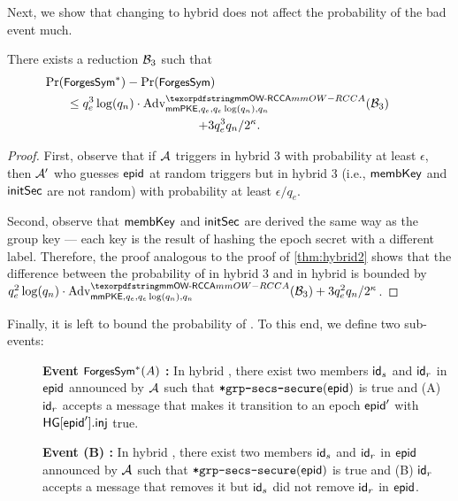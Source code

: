 Next, we show that changing to hybrid \hybridThreeN does not affect the probability of the bad event much.
\begin{claim}
  There exists a reduction $\Bdv[3]$ such that
  \begin{multline*}
    \Pr(\forgessN) - \Pr(\forgess) \hspace*{16em}\\\leq q_e^3\log(q_n) \cdot
    \textnormal{Adv}^{\mmowrcca}_{\mmPKE,q_e,q_e\log(q_n),q_n}(\Bdv[3]) \\
    + 3q_e^3q_n/2^\kappa.
  \end{multline*}
\end{claim}
\begin{proof}
  First, observe that if $\Adv$ triggers \forgess in hybrid 3 with probability at least $\epsilon$, then $\Adv'$ who guesses $\hgnodeid$ at random triggers \forgessN but in hybrid 3 (i.e., $\membershipKey$ and $\initSecret$ are not random) with probability at least $\epsilon/q_e$.

  Second, observe that $\membershipKey$ and $\initSecret$ are derived the same way as the group key --- each key is the result of hashing the epoch secret with a different label. Therefore, the proof analogous to the proof of \cref{thm:hybrid2} shows that the difference between the probability of \forgessN in hybrid 3 and \forgessN in hybrid \hybridThreeN is bounded by $q_e^2\log(q_n) \cdot \textnormal{Adv}^{\mmowrcca}_{\mmPKE,q_e,q_e\log(q_n),q_n}(\Bdv[3]) + 3q_e^2q_n/2^\kappa$.
\end{proof}

Finally, it is left to bound the probability of \forgessN. To this end, we define two sub-events:
\begin{description}
  \item[] {\bf Event $\forgessN(A)$ : } In hybrid \hybridThreeN, there exist two members $\id_s$ and $\id_r$ in $\hgnodeid$ announced by $\Adv$ such that $\safeGrpSecsSecure(\hgnodeid)$ is true and (A) $\id_r$ accepts a message that makes it transition to an epoch $\hgnodeid'$ with $\hg[\hgnodeid'].\hginj$ true.
  \item[] {\bf Event \forgessN(B) : } In hybrid \hybridThreeN, there exist two members $\id_s$ and $\id_r$ in $\hgnodeid$ announced by $\Adv$ such that $\safeGrpSecsSecure(\hgnodeid)$ is true and (B) $\id_r$ accepts a message that removes it but $\id_s$ did not remove $\id_r$ in $\hgnodeid$.
\end{description}

